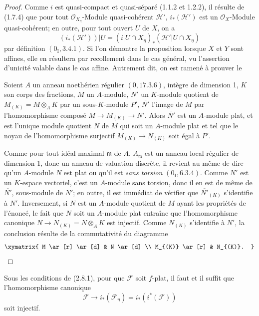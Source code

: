 \begin{proof}
Comme $i$ est quasi-compact et quasi-séparé (1.1.2 et 1.2.2), il résulte de
(1.7.4) que pour tout $\mathcal O_{X_\eta}$-Module quasi-cohérent
$\mathcal H'$, $i_*(\mathcal H')$ est un $\mathcal O_X$-Module
quasi-cohérent; en outre, pour tout ouvert $U$ de $X$, on a
\[
(i_*(\mathcal H'))|U=(i|U\cap X_\eta)_*(\mathcal H'|U\cap X_\eta)
\]
par définition $(0_{\mathrm I},3.4.1)$. Si l'on démontre la proposition
lorsque $X$ et $Y$ sont affines, elle en résultera par recollement dans le cas
général, vu l'assertion d'unicité valable dans le cas affine. Autrement dit,
on est ramené à prouver le

\begin{lemma}[2.8.1.1]
\label{IV.2.8.1.1-fr}
Soient $A$ un anneau noethérien régulier $(0,17.3.6)$, intègre de dimension
1, $K$ son corps des fractions, $M$ un $A$-module, $N'$ un $K$-module
quotient de $M_{(K)}=M\otimes_A K$ par un sous-$K$-module $P'$,
$\overline{N'}$ l'image de $M$ par l'homomorphisme composé
$M\to M_{(K)}\to N'$. Alors $\overline{N'}$ est un $A$-module plat, et est
l'unique module quotient $N$ de $M$ qui soit un $A$-module plat et tel que le
noyau de l'homomorphisme surjectif $M_{(K)}\to N_{(K)}$ soit égal à $P'$.
\end{lemma}

Comme pour tout idéal maximal $\mathfrak m$ de $A$, $A_{\mathfrak m}$ est un
anneau local régulier de dimension 1, donc un anneau de valuation discrète,
il revient au même de dire qu'un $A$-module $N$ est plat ou qu'il est
\emph{sans torsion} $(0_{\mathrm I},6.3.4)$. Comme $N'$ est un $K$-espace
vectoriel, c'est un $A$-module sans torsion, donc il en est de même de
$\overline{N'}$, sous-module de $N'$; en outre, il est immédiat de vérifier
que $\overline{N'}_{(K)}$ s'identifie à $N'$. Inversement, si $N$ est un
$A$-module quotient de $M$ ayant les propriétés de l'énoncé, le fait que $N$
soit un $A$-module plat entraîne que l'homomorphisme canonique
$N\to N_{(K)}=N\otimes_A K$ est injectif. Comme $N_{(K)}$ s'identifie à
$N'$, la conclusion résulte de la commutativité du diagramme
\[
\xymatrix{
M \ar[r] \ar[d] & N \ar[d] \\
M_{(K)} \ar[r] & N_{(K)}.
}
\]
\end{proof}

\begin{corollary}[2.8.2]
\label{IV.2.8.2-fr}
Sous les conditions de (2.8.1), pour que $\mathcal F$ soit $f$-plat, il faut
et il suffit que l'homomorphisme canonique
\[
\mathcal F\longrightarrow i_*(\mathcal F_\eta)=i_*(i^*(\mathcal F))
\]
soit injectif.
\end{corollary}

